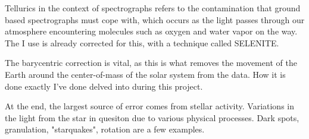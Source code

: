 Tellurics in the context of spectrographs refers to the contamination that ground based spectrographs must cope with, which occurs as the light passes through our atmosphere encountering molecules such as oxygen and water vapor on the way. The I use is already corrected for this, with a technique called SELENITE\cite{yale_data}.

The barycentric correction is vital, as this is what removes the movement of the Earth around the center-of-mass of the solar system from the data. How it is done exactly I've done delved into during this project. 

At the end, the largest source of error comes from stellar activity. Variations in the light from the star in quesiton due to various physical processes. Dark spots, granulation, "starquakes", rotation are a few examples. 

